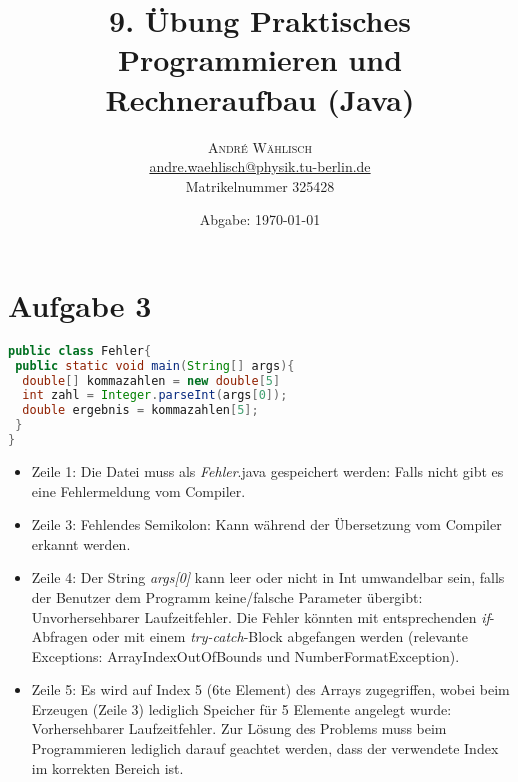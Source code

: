 \documentclass{scrartcl}
\begin{document}
\title{9. Übung Praktisches Programmieren und Rechneraufbau (Java)}

\date{Abgabe: \today}

\author{
\large
\textsc{André Wählisch}\\[2mm]
\normalsize \href{mailto:andre.waehlisch@physik.tu-berlin.de}{andre.waehlisch@physik.tu-berlin.de} \\
\normalsize Matrikelnummer 325428 
}

\maketitle

\section*{Aufgabe 3}

\begin{lstlisting}[language=java]
public class Fehler{
 public static void main(String[] args){
  double[] kommazahlen = new double[5]
  int zahl = Integer.parseInt(args[0]);
  double ergebnis = kommazahlen[5];
 }
}
\end{lstlisting}

\begin{itemize}
	\item Zeile 1: Die Datei muss als \emph{Fehler}.java gespeichert werden: Falls nicht gibt es eine Fehlermeldung vom Compiler.
	\item Zeile 3: Fehlendes Semikolon: Kann während der Übersetzung vom Compiler erkannt werden.
	\item Zeile 4: Der String \emph{args[0]} kann leer oder nicht in Int umwandelbar sein, falls der Benutzer dem Programm keine/falsche Parameter übergibt: Unvorhersehbarer Laufzeitfehler. Die Fehler könnten mit entsprechenden \emph{if}-Abfragen oder mit einem \emph{try-catch}-Block abgefangen werden (relevante Exceptions: ArrayIndexOutOfBounds und NumberFormatException).
	\item Zeile 5: Es wird auf Index 5 (6te Element) des Arrays zugegriffen, wobei beim Erzeugen (Zeile 3) lediglich Speicher für 5 Elemente angelegt wurde: Vorhersehbarer Laufzeitfehler. Zur Lösung des Problems muss beim Programmieren lediglich darauf geachtet werden, dass der verwendete Index im korrekten Bereich ist.
\end{itemize}
\end{document}
